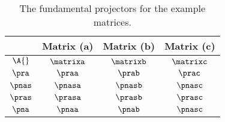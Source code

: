 \begin{table}[htdp]
\caption[The fundamental projectors for the example matrices]{The fundamental projectors for the example matrices.}
\begin{center}
\begin{tabular}{cccc}
%
  & Matrix (a) & Matrix (b) & Matrix (c) \\\hline
%
  $\A{}$  & $\matrixa$ & $\matrixb$ & $\matrixc$ \\[20pt]
%
  $\pra$  & $\praa$    & $\prab$    & $\prac$    \\[10pt]
%
  $\pnas$ & $\pnasa$   & $\pnasb$   & $\pnasc$   \\[20pt]
%
  $\pras$ & $\prasa$   & $\prasb$   & $\prasc$   \\[10pt]
%
  $\pna$  & $\pnaa$    & $\pnab$    & $\pnasc$   
%
\end{tabular}
\end{center}
\label{tab:projectors:examples}
\end{table}

\endinput